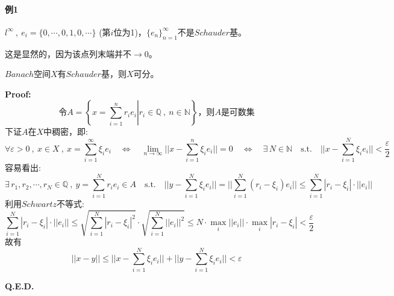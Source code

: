 \paragraph*{例1} \quad $l^{\infty} \ , \ e_i=\{0,\cdots,0,1,0,\cdots\}$ (第$i$位为1)，$\{e_n\}_{n=1}^{\infty}$不是$Schauder$基。

这是显然的，因为该点列末端并不$\to 0$。
\begin{theorem}
    $Banach$空间$X$有$Schauder$基，则$X$可分。
\end{theorem}
\textbf{Proof:}
\[\text{令}A=\left\{\left.x=\sum_{i=1}^nr_ie_i\right|r_i \in \mathbb{Q} \ , \ n \in \mathbb{N}\right\}\text{，则$A$是可数集}\]
下证$A$在$X$中稠密，即:
\[\forall \varepsilon>0 \ , \ x \in X \ , \ x=\sum_{i=1}^{\infty}\xi_ie_i \quad \Leftrightarrow \quad \lim_{n \to \infty}||x-\sum_{i=1}^n\xi_ie_i||=0 \quad \Leftrightarrow \quad \exists \, N \in \mathbb{N} \quad \text{s.t.} \quad ||x-\sum_{i=1}^N\xi_ie_i||<\frac{\varepsilon}{2}\]
容易看出:
\[\exists \, r_1,r_2,\cdots,r_N \in \mathbb{Q} \ , \ y=\sum_{i=1}^Nr_ie_i \in A \quad \text{s.t.} \quad ||y-\sum_{i=1}^N\xi_ie_i||=||\sum_{i=1}^N(r_i-\xi_i)e_i|| \leq \sum_{i=1}^N|r_i-\xi_i|\cdot||e_i||\]
利用$Schwartz$不等式:
\[\sum_{i=1}^N|r_i-\xi_i|\cdot||e_i|| \leq \sqrt{\sum_{i=1}^N|r_i-\xi_i|^2} \cdot \sqrt{\sum_{i=1}^N||e_i||^2} \leq N \cdot \mathop \text{max}\limits_i||e_i|| \cdot \mathop \text{max}\limits_i|r_i-\xi_i|<\frac{\varepsilon}{2}\]
故有
\[||x-y|| \leq ||x-\sum_{i=1}^N\xi_ie_i||+||y-\sum_{i=1}^N\xi_ie_i||<\varepsilon\]

\textbf{Q.E.D.}

